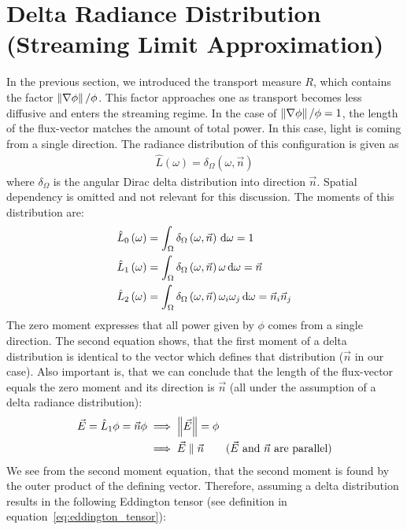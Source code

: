 \section{Delta Radiance Distribution (Streaming Limit Approximation)}
\label{sec:fld_streaming_limit_approximation}


In the previous section, we introduced the transport measure $R$, which contains the factor $\left\lVert\nabla\phi\right\rVert/\phi$. This factor approaches one as transport becomes less diffusive and enters the streaming regime. In the case of $\left\lVert\nabla\phi\right\rVert/\phi=1$, the length of the flux-vector matches the amount of total power. In this case, light is coming from a single direction. The radiance distribution of this configuration is given as
\begin{align}
\hat{L}\left(\omega\right)=\delta_{\Omega}\left(\omega,\vec{n}\right)
\end{align}
where $\delta_{\Omega}$ is the angular Dirac delta distribution into direction $\vec{n}$. Spatial dependency is omitted and not relevant for this discussion. The moments of this distribution are:
\begin{align}
\label{eq:zero_moment_Lhat}
\hat{L}_0\left(\omega\right)&=\int_{\Omega}{\delta_{\Omega}\left(\omega,\vec{n}\right)\,\mathrm{d}\omega} = 1\\
\label{eq:first_moment_Lhat}
\hat{L}_1\left(\omega\right)&=\int_{\Omega}{\delta_{\Omega}\left(\omega,\vec{n}\right)\omega\,\mathrm{d}\omega} = \vec{n}\\
\label{eq:second_moment_Lhat}
\hat{L}_2\left(\omega\right)&=\int_{\Omega}{\delta_{\Omega}\left(\omega,\vec{n}\right)\omega_i\omega_j\,\mathrm{d}\omega} = \vec{n}_i\vec{n}_j
\end{align}
The zero moment expresses that all power given by $\phi$ comes from a single direction. The second equation shows, that the first moment of a delta distribution is identical to the vector which defines that distribution ($\vec{n}$ in our case). Also important is, that we can conclude that the length of the flux-vector equals the zero moment and its direction is $\vec{n}$ (all under the assumption of a delta radiance distribution):
\begin{align}
\label{eq:iso_delta_normE}
\vec{E} = \hat{L}_1\phi = \vec{n}\phi  &\implies \left\lVert\vec{E}\right\rVert = \phi\\
&\implies \vec{E} \parallel \vec{n} \qquad \text{($\vec{E}$ and $\vec{n}$ are parallel)}
\end{align}
We see from the second moment equation, that the second moment is found by the outer product of the defining vector. Therefore, assuming a delta distribution results in the following Eddington tensor (see definition in equation~\ref{eq:eddington_tensor}):
